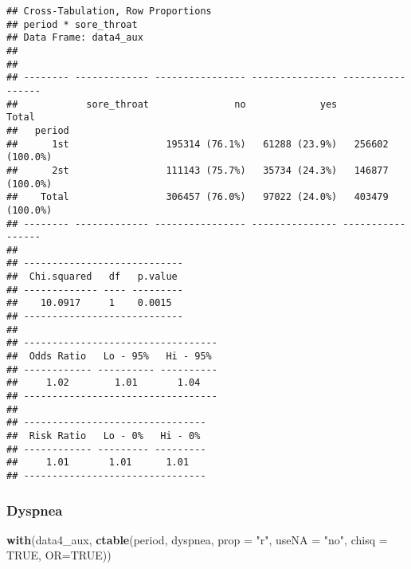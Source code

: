 \documentclass[
]{article}
\newenvironment{Shaded}{\begin{snugshade}}{\end{snugshade}}
\newcommand{\DataTypeTok}[1]{\textcolor[rgb]{0.13,0.29,0.53}{#1}}
\newcommand{\KeywordTok}[1]{\textcolor[rgb]{0.13,0.29,0.53}{\textbf{#1}}}
\newcommand{\NormalTok}[1]{#1}
\newcommand{\OtherTok}[1]{\textcolor[rgb]{0.56,0.35,0.01}{#1}}
\newcommand{\StringTok}[1]{\textcolor[rgb]{0.31,0.60,0.02}{#1}}
\begin{document}
\begin{verbatim}
## Cross-Tabulation, Row Proportions  
## period * sore_throat  
## Data Frame: data4_aux  
## 
## 
## -------- ------------- ---------------- --------------- -----------------
##            sore_throat               no             yes             Total
##   period                                                                 
##      1st                 195314 (76.1%)   61288 (23.9%)   256602 (100.0%)
##      2st                 111143 (75.7%)   35734 (24.3%)   146877 (100.0%)
##    Total                 306457 (76.0%)   97022 (24.0%)   403479 (100.0%)
## -------- ------------- ---------------- --------------- -----------------
## 
## ----------------------------
##  Chi.squared   df   p.value 
## ------------- ---- ---------
##    10.0917     1    0.0015  
## ----------------------------
## 
## ----------------------------------
##  Odds Ratio   Lo - 95%   Hi - 95% 
## ------------ ---------- ----------
##     1.02        1.01       1.04   
## ----------------------------------
## 
## --------------------------------
##  Risk Ratio   Lo - 0%   Hi - 0% 
## ------------ --------- ---------
##     1.01       1.01      1.01   
## --------------------------------
\end{verbatim}

\hypertarget{dyspnea-1}{%
\subsubsection{Dyspnea}\label{dyspnea-1}}

\begin{Shaded}
\begin{Highlighting}[]
\KeywordTok{with}\NormalTok{(data4_aux, }\KeywordTok{ctable}\NormalTok{(period, dyspnea, }\DataTypeTok{prop =} \StringTok{"r"}\NormalTok{, }\DataTypeTok{useNA =} \StringTok{"no"}\NormalTok{, }\DataTypeTok{chisq =} \OtherTok{TRUE}\NormalTok{, }\DataTypeTok{OR=}\OtherTok{TRUE}\NormalTok{))}
\end{Highlighting}
\end{Shaded}
\end{document}
